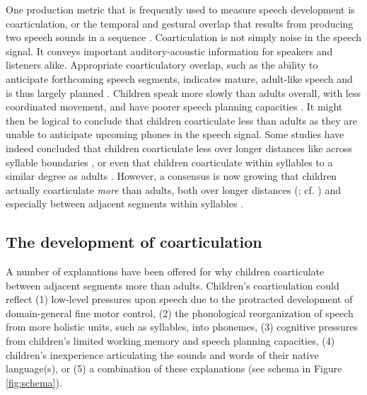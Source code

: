 \documentclass[a4paper,man,natbib,donotrepeattitle, apacite]{apa6}
\begin{document}
One production metric that is frequently used to measure speech development is coarticulation, or the temporal and gestural overlap that results from producing two speech sounds in a sequence \cite{gerosaAnalyzingChildrenSpeech2006,goffmanBreadthCoarticulatoryUnits2008,zharkovaCoarticulationIndicatorSpeech2011}. Coarticulation is not simply noise in the speech signal. It conveys important auditory-acoustic information for speakers and listeners alike. Appropriate coarticulatory overlap, such as the ability to anticipate forthcoming speech segments, indicates mature, adult-like speech and is thus largely planned \cite{barbierWhatAnticipatoryCoarticulation2020,bradlowConfluentTalkerListeneroriented2002,whalenCoarticulationLargelyPlanned1990}. Children speak more slowly than adults overall, with less coordinated movement, and have poorer speech planning capacities \cite{greenPhysiologicDevelopmentSpeech2000,goffmanRelationsSegmentalMotor2007,leeAcousticsChildrenSpeech1999}. It might then be logical to conclude that children coarticulate less than adults as they are unable to anticipate upcoming phones in the speech signal. Some studies have indeed concluded that children coarticulate less over longer distances like across syllable boundaries \cite{barbierWhatAnticipatoryCoarticulation2020}, or even that children coarticulate within syllables to a similar degree as adults \cite{katzAnticipatoryCoarticulationSpeech1991,noirayDevelopmentMotorSynergies2013,serenoDevelopmentalAspectsLingual1987,zharkovaDynamicsVoicelessSibilant2018}. However, a consensus is now growing that children actually coarticulate \textit{more} than adults, both over longer distances (; cf. ) and especially between adjacent segments within syllables \cite{nittrouerEmergencePhoneticSegments1989,nittrouerHowChildrenLearn1996,noirayBackFutureNonlinear2019,rubertusVocalicActivationWidth2020,zharkovaCoarticulationIndicatorSpeech2011,zharkovaSpatialTemporalLingual2014}. 

\subsection{The development of coarticulation}

A number of explanations have been offered for why children coarticulate between adjacent segments more than adults. Children’s coarticulation could reflect (1) low-level pressures upon speech due to the protracted development of domain-general fine motor control, (2) the phonological reorganization of speech from more holistic units, such as syllables, into phonemes, (3) cognitive pressures from children's limited working memory and speech planning capacities, (4) children's inexperience articulating the sounds and words of their native language(s), or (5) a combination of these explanations (see schema in Figure \ref{fig:schema}). 
\end{document}
